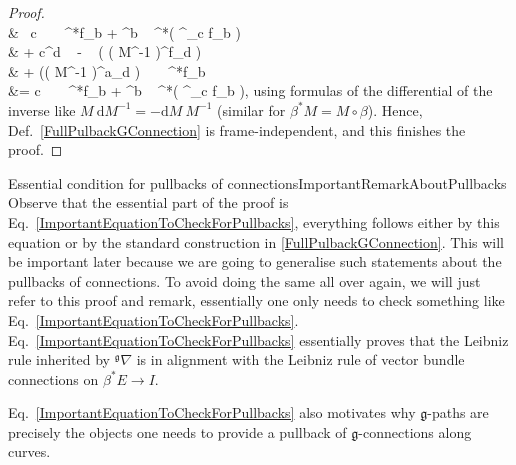 \begin{proof}
\\
&\quad~
c ~  ~ \beta^*f_b
	+ \tilde{\mu}^b ~ \beta^*\mleft( {}^{}\nabla_{c \alpha} f_b \mright)
\\
&\hspace{1cm}
	+ c\tilde{\mu}^d ~ \text{\Large$\Biggl($}
		-  ~ \mleft( \mleft( M^{-1} \mright)^f_d \circ \beta  \mright)
\\
&  \hspace{2cm}
		+ \mleft(\mleft( M^{-1} \mright)^a_d \circ \beta \mright) ~ 
	\text{\Large$\Biggr)$} ~ \beta^*f_b
\\
&=
c ~  ~ \beta^*f_b
	+ \tilde{\mu}^b ~ \beta^*\mleft( {}^{}\nabla_{c \alpha} f_b \mright),
\eas
using formulas of the differential of the inverse like $M ~ \mathrm{d}M^{-1} = - \mathrm{d}M ~ M^{-1}$ (similar for $\beta^*M = M \circ \beta$). Hence, Def.~\eqref{FullPulbackGConnection} is frame-independent, and this finishes the proof.
\end{proof}

\begin{remarks}{Essential condition for pullbacks of connections}{ImportantRemarkAboutPullbacks}
Observe that the essential part of the proof is Eq.~\eqref{ImportantEquationToCheckForPullbacks}, everything follows either by this equation or by the standard construction in \eqref{FullPulbackGConnection}. This will be important later because we are going to generalise such statements about the pullbacks of connections. To avoid doing the same all over again, we will just refer to this proof and remark, essentially one only needs to check something like Eq.~\eqref{ImportantEquationToCheckForPullbacks}. Eq.~\eqref{ImportantEquationToCheckForPullbacks} essentially proves that the Leibniz rule inherited by ${}^\mathfrak{g}\nabla$ is in alignment with the Leibniz rule of vector bundle connections on $\beta^*E \to I$.

Eq.~\eqref{ImportantEquationToCheckForPullbacks} also motivates why $\mathfrak{g}$-paths are precisely the objects one needs to provide a pullback of $\mathfrak{g}$-connections along curves.
\end{remarks}

